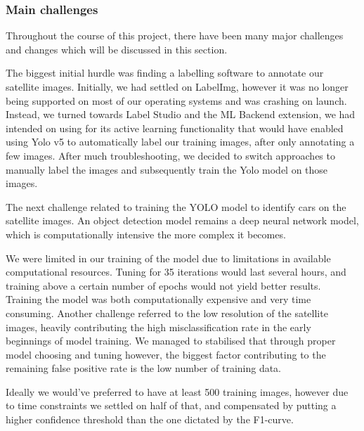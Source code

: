 \subsubsection{Main challenges}
Throughout the course of this project, there have been many major challenges and changes which will be discussed in this section.

The biggest initial hurdle was finding a labelling software to annotate our satellite images. Initially, we had settled on LabelImg, however it was no longer being supported on most of our operating systems and was crashing on launch.
Instead, we turned towards Label Studio and the ML Backend extension, we had intended on using for its active learning functionality that would have enabled using Yolo v5 to automatically label our training images, after only annotating a few images.
After much troubleshooting, we decided to switch approaches to manually label the images and subsequently train the Yolo model on those images.

The next challenge related to training the YOLO model to identify cars on the satellite images. An object detection model remains a deep neural network model, which is computationally intensive the more complex it becomes.

We were limited in our training of the model due to limitations in available computational resources. Tuning for 35 iterations would last several hours, and training above a certain number of epochs would not yield better results. Training the model was both computationally expensive and very time consuming.
Another challenge referred to the low resolution of the satellite images, heavily contributing the high misclassification rate in the early beginnings of model training. We managed to stabilised that through proper model choosing and tuning however, the biggest factor contributing to the remaining false positive rate is the low number of training data.

Ideally we would've preferred to have at least 500 training images, however due to time constraints we settled on half of that, and compensated by putting a higher confidence threshold than the one dictated by the F1-curve.


